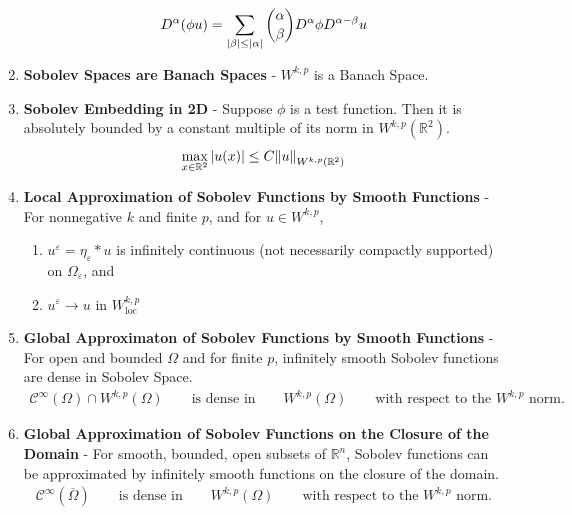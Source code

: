 \documentclass{article}
\newcommand{\E}{\varepsilon}
\newcommand{\Rl}{\mathbb{R}}
\begin{document}
\begin{enumerate}
            \begin{align*}
                D^\alpha(\phi u) = \sum_{\abs{\beta} \leq \abs{\alpha}} \binom{\alpha}{\beta}D^\alpha \phi D^{\alpha - \beta} u
            \end{align*}
        \item
                \textbf{Sobolev Spaces are Banach Spaces} - $W^{k,p}$ is a Banach Space.
        \item
            \textbf{Sobolev Embedding in 2D} - Suppose $\phi$ is a test function.  Then it is absolutely bounded by a constant multiple of its norm in $W^{k,p}(\Rl^2)$.
            \begin{align*}
                \max_{x\in\Rl^2}\abs{u(x)} \leq C \norm{u}_{W^{k,p}(\Rl^2)}
            \end{align*}
        \item
            \textbf{Local Approximation of Sobolev Functions by Smooth Functions} - For nonnegative $k$ and finite $p$, and for $u \in W^{k,p}$,
            \begin{enumerate}
                \item
                    $u^\E = \eta_\E * u$ is infinitely continuous (not necessarily compactly supported) on $\Omega_\E$, and
                \item
                    $u^\E \rightarrow u$ in $W_\text{loc}^{k,p}$
            \end{enumerate}
        \item
            \textbf{Global Approximaton of Sobolev Functions by Smooth Functions} - For open and bounded $\Omega$ and for finite $p$, infinitely smooth Sobolev functions are dense in Sobolev Space.
            \begin{align*}
                \mathcal{C}^\infty(\Omega) \cap W^{k,p}(\Omega) \qquad \text{is dense in} \qquad W^{k,p}(\Omega) \qquad \text{with respect to the $W^{k,p}$ norm.}
            \end{align*}
        \item
            \textbf{Global Approximation of Sobolev Functions on the Closure of the Domain} - For smooth, bounded, open subsets of $\Rl^n$, Sobolev functions can be approximated by infinitely smooth functions on the closure of the domain.
            \begin{align*}
                \mathcal{C}^\infty(\overline{\Omega}) \qquad \text{is dense in} \qquad W^{k,p}(\Omega) \qquad \text{with respect to the $W^{k,p}$ norm.}
            \end{align*}

\end{enumerate}
\end{document}
